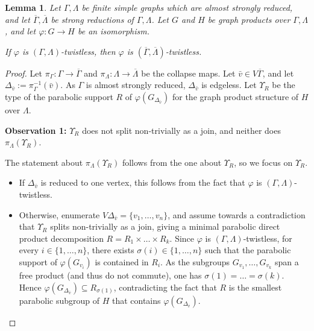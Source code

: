 \documentclass[a4paper,english,11pt]{article}
\newtheorem{lemma}[de]{Lemma}
\theoremstyle{definition}
\theoremstyle{remark}
\begin{document}
\begin{lemma}\label{lemma:twistless-collapse}
Let $\Gamma,\Lambda$ be finite simple graphs which are almost strongly reduced, and let $\overline{\Gamma},\overline{\Lambda}$ be strong reductions of $\Gamma,\Lambda$. Let $G$ and $H$ be graph products over $\Gamma,\Lambda$, and let $\varphi:G\to H$ be an isomorphism.

If $\varphi$ is $(\Gamma,\Lambda)$-twistless, then $\varphi$ is $(\overline{\Gamma},\overline{\Lambda})$-twistless.
\end{lemma}

\begin{proof}
Let $\pi_\Gamma:\Gamma\to\overline{\Gamma}$ and $\pi_{\Lambda}:\Lambda\to\overline{\Lambda}$ be the collapse maps. Let $\bar v\in V\overline{\Gamma}$, and let $\Delta_{\bar v}:=\pi_\Gamma^{-1}(\bar v)$. As $\Gamma$ is almost strongly reduced, $\Delta_{\bar v}$ is edgeless. Let $\Upsilon_R$ be the type of the parabolic support $R$ of $\varphi(G_{\Delta_{\bar v}})$ for the graph product structure of $H$ over $\Lambda$.

\medskip

\textbf{Observation 1:} $\Upsilon_R$ does not split non-trivially as a join, and neither does $\pi_\Lambda(\Upsilon_R)$. 

The statement about $\pi_\Lambda(\Upsilon_R)$ follows from the one about $\Upsilon_R$, so we focus on $\Upsilon_R$.
\begin{itemize}
\item If $\Delta_{\bar v}$ is reduced to one vertex, this follows from the fact that $\varphi$ is $(\Gamma,\Lambda)$-twistless. 
\item Otherwise, enumerate $V\Delta_{\bar v}=\{v_1,\dots,v_n\}$, and assume towards a contradiction that $\Upsilon_R$ splits non-trivially as a join, giving a minimal parabolic direct product decomposition $R=R_1\times\dots\times R_k$. Since $\varphi$ is $(\Gamma,\Lambda)$-twistless, for every $i\in\{1,\dots,n\}$, there exists $\sigma(i)\in\{1,\dots,n\}$ such that the parabolic support of $\varphi(G_{v_i})$ is contained in $R_i$. As the subgroups $G_{v_1},\dots,G_{v_k}$ span a free product (and thus do not commute), one has $\sigma(1)=\dots=\sigma(k)$. Hence $\varphi(G_{\Delta_{\bar v}})\subseteq R_{\sigma(1)}$, contradicting the fact that $R$ is the smallest parabolic subgroup of $H$ that contains $\varphi(G_{\Delta_{\bar v}})$.   
\end{itemize} 

\medskip


\end{proof}
\end{document}
